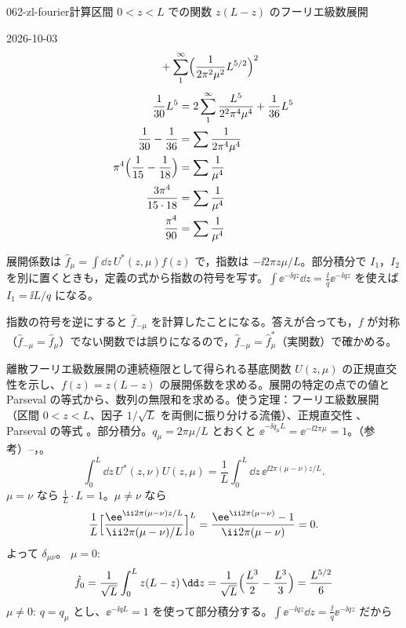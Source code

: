\documentclass[uplatex,dvipdfmx,a4paper,11pt]{jsarticle}
\begin{document}
\begin{mondai}{062-zl-fourier}{計算}{区間 $0<z<L$ での関数 $z(L-z)$ のフーリエ級数展開}
\begin{kotaeutsushi}{2026-10-03}
\begin{align*}
  &\qquad+\sum_{1}^{\infty}\Bigl(\frac{1}{2\pi^{2}\mu^{2}}L^{5/2}\Bigr)^{2}
\end{align*}
\begin{align*}
  \frac{1}{30}L^{5}&=2\sum_{1}^{\infty}\frac{L^{5}}{2^{2}\pi^{4}\mu^{4}}+\frac{1}{36}L^{5}\\
  \frac{1}{30}-\frac{1}{36}&=\sum\frac{1}{2\pi^{4}\mu^{4}}\\
  \pi^{4}\Bigl(\frac{1}{15}-\frac{1}{18}\Bigr)&=\sum\frac{1}{\mu^{4}}\\
  \frac{3\pi^{4}}{15\cdot18}&=\sum\frac{1}{\mu^{4}}\\
  \frac{\pi^{4}}{90}&=\sum\frac{1}{\mu^{4}}
\end{align*}
\end{kotaeutsushi}
\begin{kizuki}
\item 展開係数は $\hat{f}_{\mu}=\int\dd z\,U^{*}(z,\mu)f(z)$ で，指数は $-\ii2\pi z\mu/L$。部分積分で $I_1$，$I_2$ を別に置くときも，定義の式から指数の符号を写す。$\int\ee^{-\ii qz}\dd z=\frac{\ii}{q}\ee^{-\ii qz}$ を使えば $I_1=\ii L/q$ になる。
\item 指数の符号を逆にすると $\hat{f}_{-\mu}$ を計算したことになる。答えが合っても，$f$ が対称（$\hat{f}_{-\mu}=\hat{f}_{\mu}$）でない関数では誤りになるので，$\hat{f}_{-\mu}=\hat{f}_{\mu}^{*}$（実関数）で確かめる。
\end{kizuki}
\begin{tadashii}
\houshin 離散フーリエ級数展開の連続極限として得られる基底関数 $U(z,\mu)$ の正規直交性を示し、$f(z)=z(L-z)$ の展開係数を求める。展開の特定の点での値と Parseval の等式から、数列の無限和を求める。使う定理：フーリエ級数展開 （区間 $0<z<L$、因子 $1/\sqrt{L}$ を両側に振り分ける流儀）、正規直交性 、Parseval の等式 。部分積分。$q_{\mu}=2\pi\mu/L$ とおくと $\ee^{-\ii q_{\mu}L}=\ee^{-\ii2\pi\mu}=1$。（参考）--，。 %
\keisan
{}
\[
\int_{0}^{L}\dd z\,U^{*}(z,\nu)U(z,\mu)=\frac{1}{L}\int_{0}^{L}\dd z\,\ee^{\ii2\pi(\mu-\nu)z/L}.
\]
$\mu=\nu$ なら $\frac{1}{L}\cdot L=1$。$\mu\neq\nu$ なら
\[
\frac{1}{L}\Bigl[\frac{\ee^{\ii2\pi(\mu-\nu)z/L}}{\ii2\pi(\mu-\nu)/L}\Bigr]_{0}^{L}=\frac{\ee^{\ii2\pi(\mu-\nu)}-1}{\ii2\pi(\mu-\nu)}=0 .
\]
よって $\delta_{\mu\nu}$。
 $\mu=0$:
\[
\hat{f}_0=\frac{1}{\sqrt{L}}\int_{0}^{L}z(L-z)\,\dd z=\frac{1}{\sqrt{L}}\Bigl(\frac{L^{3}}{2}-\frac{L^{3}}{3}\Bigr)=\frac{L^{5/2}}{6}
\]
$\mu\neq0$: $q=q_{\mu}$ とし、$\ee^{-\ii qL}=1$ を使って部分積分する。$\int\ee^{-\ii qz}\dd z=\frac{\ii}{q}\ee^{-\ii qz}$ だから

\end{tadashii}
\end{mondai}
\end{document}
